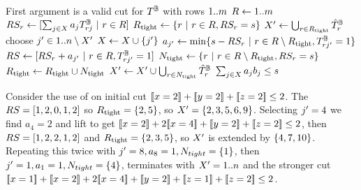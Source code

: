 \documentclass[a4paper,UKenglish,cleveref,autoref,thm-restate]{lipics-v2021}
\begin{document}
\begin{algorithm}
\caption{The \lazyCutlift algorithm}
\label{lst:cutlift}
\begin{algorithmic}[1]
    \Require First argument is a valid cut for $T^{\mathbb{B}}$ with rows $1..m$
    \codeBlockDelim
        \State $R \gets 1..m$
        \State $RS_r \gets [\sum_{j \in X} a_j T^{\mathbb{B}}_{rj} ~|~ r \in R]$ 
        \label{lst:cutlift:RS}
        \State $R_{\text{tight}} \gets \{r ~|~ r \in R, RS_r = s\}$
        \label{lst:cutlift:tight}
        \State $X' \gets \bigcup_{r \in R_{\text{tight}}} \hat{T}^{\mathbb{B}}_r$
        \label{lst:cutlift:X}
        \While{$\Cols \setminus \Xtight \neq \emptyset$ }
            \State choose $j' \in 1..n \setminus X'$
            \State $X \gets X \cup \{j'\}$
            \State $a_{j'} \gets \min \{s - RS_r ~|~ r \in R \setminus R_{\text{tight}}, T^{\mathbb{B}}_{rj'} = 1\}$
            \label{lst:cutlift:a}
            \State $RS \gets [RS_r + a_{j'} ~|~ r \in R, T^{\mathbb{B}}_{rj'}=1]$
            \label{lst:cutlift:RSj}
            \State $N_{\text{tight}} \gets \{r ~|~ r \in R \setminus R_{\text{tight}}, RS_r = s\}$
            \label{lst:cutlift:update:start}
            \State $R_{\text{tight}} \gets R_{\text{tight}} \cup N_{\text{tight}}$
            \State $X' \gets X' \cup \bigcup_{r \in N_{\text{tight}}} \hat{T}^{\mathbb{B}}_r$
            \label{lst:cutlift:update:end}
        \EndWhile
        \State \Return $\sum_{j \in X} a_j b_j \leq s$
    \EndFunction
\end{algorithmic}
\end{algorithm}


\begin{example}
    Consider the use of \lazyCutlift on 
    initial cut $\be{1}{2} + \be{2}{2} + \be{3}{2} \leq 2$.
    The $RS = [1,2,0,1,2]$ so $R_{\text{tight}} = \{2,5\}$, so $X' = 
    \{2, 3, 5, 6, 9\}
    $.
    Selecting $j' = 4$ we find $a_4 = 2$
    and lift to get $\be{1}{2} + 2\be{1}{4} + \be{2}{2} + \be{3}{2} \leq 2$, then $RS = [1,2,2,1,2]$ and 
    $R_{\text{tight}} = \{2,3,5\}$, so $X'$ is extended by $\{4,7,10\}$.
    Repeating this twice with $j' = 8, a_{8} = 1, N_{tight} = \{1\}$, then $j' = 1, a_{1} = 1, N_{tight} = \{4\}$, terminates \lazyCutlift with $X' = 1..n$ and the stronger cut $\be{1}{1} + \be{1}{2} + 2\be{1}{4} + \be{2}{2} + \be{3}{1} + \be{3}{2} \leq 2$.
\end{example}
\end{document}
